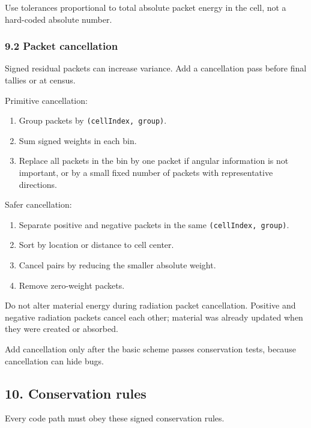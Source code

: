 \documentclass[
]{article}
\providecommand{\tightlist}{%
  \setlength{\itemsep}{0pt}\setlength{\parskip}{0pt}}
\begin{document}
Use tolerances proportional to total absolute packet energy in the cell,
not a hard-coded absolute number.

\subsubsection{9.2 Packet cancellation}\label{packet-cancellation}

Signed residual packets can increase variance. Add a cancellation pass
before final tallies or at census.

Primitive cancellation:

\begin{enumerate}
\def\labelenumi{\arabic{enumi}.}
\tightlist
\item
  Group packets by \texttt{(cellIndex,\ group)}.
\item
  Sum signed weights in each bin.
\item
  Replace all packets in the bin by one packet if angular information is
  not important, or by a small fixed number of packets with
  representative directions.
\end{enumerate}

Safer cancellation:

\begin{enumerate}
\def\labelenumi{\arabic{enumi}.}
\tightlist
\item
  Separate positive and negative packets in the same
  \texttt{(cellIndex,\ group)}.
\item
  Sort by location or distance to cell center.
\item
  Cancel pairs by reducing the smaller absolute weight.
\item
  Remove zero-weight packets.
\end{enumerate}

Do not alter material energy during radiation packet cancellation.
Positive and negative radiation packets cancel each other; material was
already updated when they were created or absorbed.

Add cancellation only after the basic scheme passes conservation tests,
because cancellation can hide bugs.

\subsection{10. Conservation rules}\label{conservation-rules}

Every code path must obey these signed conservation rules.
\end{document}
